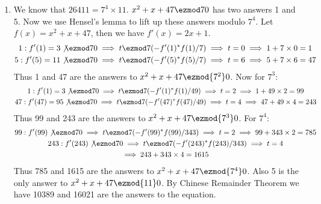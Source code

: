 \begin{enumerate}[label=]
    \item 
        We know that $26411 = 7^4 \times 11$.
        $x^2 + x + 47 \ezmod 7 0$ has two answers 1 and 5. Now we use Hensel's lemma to lift up these answers modulo $7^4$. Let $f(x) = x^2 + x + 47$, then we have $f'(x) = 2x + 1$.
        \begin{gather*}
            1 : f'(1) = 3 \not \ezmod 7 0 \implies t \ezmod 7 (-f'(1)^* f(1)/7) \implies t = 0 \implies 1 + 7 \times 0 = 1\\
            5 : f'(5) = 11 \not \ezmod 7 0 \implies t \ezmod 7 (-f'(5)^* f(5)/7) \implies t = 6 \implies 5 + 7 \times 6 = 47
        \end{gather*}
        Thus 1 and 47 are the answers to $x^2 + x + 47 \ezmod{7^2} 0$. Now for $7^3$:
        \begin{gather*}
            1: f'(1) = 3 \not \ezmod 7 0 \implies t \ezmod 7 (-f'(1)^* f(1)/49) \implies t = 2 \implies 1 + 49 \times 2 = 99 \\
            47: f'(47) = 95 \not \ezmod 7 0 \implies t \ezmod 7 (-f'(47)^* f(47)/49) \implies t = 4 \implies 47 + 49 \times 4 = 243
        \end{gather*}
        Thus 99 and 243 are the answers to $x^2 + x + 47 \ezmod{7^3} 0$. For $7^4$:
        \begin{gather*}
            99: f'(99) \not \ezmod 7 0 \implies t \ezmod 7 (-f'(99)^* f(99)/343) \implies t = 2 \implies 99 + 343 \times 2 = 785 \\
            243: f'(243) \not \ezmod 7 0 \implies t \ezmod 7 (-f'(243)^* f(243)/343) \implies t = 4\\
             \implies 243 + 343 \times 4 = 1615
        \end{gather*}
        Thus 785 and 1615 are the answers to $x^2 + x + 47 \ezmod{7^4} 0$.
        Also 5 is the only answer to $x^2 + x + 47 \ezmod{11} 0$. By Chinese Remainder Theorem we have 10389 and 16021 are the answers to the equation.
\end{enumerate}